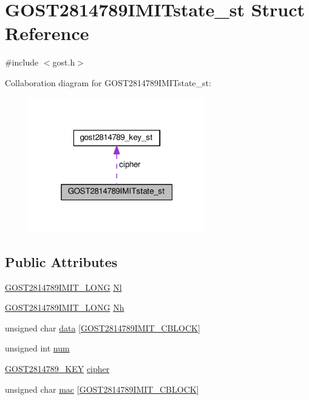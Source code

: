 \hypertarget{struct_g_o_s_t2814789_i_m_i_tstate__st}{}\section{G\+O\+S\+T2814789\+I\+M\+I\+Tstate\+\_\+st Struct Reference}
\label{struct_g_o_s_t2814789_i_m_i_tstate__st}


{\ttfamily \#include $<$gost.\+h$>$}



Collaboration diagram for G\+O\+S\+T2814789\+I\+M\+I\+Tstate\+\_\+st\+:
\nopagebreak
\begin{figure}[H]
\begin{center}
\leavevmode
\includegraphics[width=217pt]{struct_g_o_s_t2814789_i_m_i_tstate__st__coll__graph}
\end{center}
\end{figure}
\subsection*{Public Attributes}
\begin{DoxyCompactItemize}
\item 
\hyperlink{gost_8h_a49752f26434e4f3122a1fa81ec98d504}{G\+O\+S\+T2814789\+I\+M\+I\+T\+\_\+\+L\+O\+NG} \hyperlink{struct_g_o_s_t2814789_i_m_i_tstate__st_ad36394135c21dfe25d7173c0849490d1}{Nl}
\item 
\hyperlink{gost_8h_a49752f26434e4f3122a1fa81ec98d504}{G\+O\+S\+T2814789\+I\+M\+I\+T\+\_\+\+L\+O\+NG} \hyperlink{struct_g_o_s_t2814789_i_m_i_tstate__st_add0b3a60c8a27d2a9b8836495860fdf1}{Nh}
\item 
unsigned char \hyperlink{struct_g_o_s_t2814789_i_m_i_tstate__st_ac17f4db7b152abc34153aa3d514d4a1a}{data} \mbox{[}\hyperlink{gost_8h_a35ebf794a9656950a01fb8021aa98ce3}{G\+O\+S\+T2814789\+I\+M\+I\+T\+\_\+\+C\+B\+L\+O\+CK}\mbox{]}
\item 
unsigned int \hyperlink{struct_g_o_s_t2814789_i_m_i_tstate__st_aa8f628382ebf8fab9ba584a8e6355b29}{num}
\item 
\hyperlink{gost_8h_aebf1a56a3926ee4c9130714ec49fcfc0}{G\+O\+S\+T2814789\+\_\+\+K\+EY} \hyperlink{struct_g_o_s_t2814789_i_m_i_tstate__st_a124a498f4935da4fd90f1276df5de92a}{cipher}
\item 
unsigned char \hyperlink{struct_g_o_s_t2814789_i_m_i_tstate__st_aeb54715f9aa35c4ccee00589746d84d8}{mac} \mbox{[}\hyperlink{gost_8h_a35ebf794a9656950a01fb8021aa98ce3}{G\+O\+S\+T2814789\+I\+M\+I\+T\+\_\+\+C\+B\+L\+O\+CK}\mbox{]}
\end{DoxyCompactItemize}


